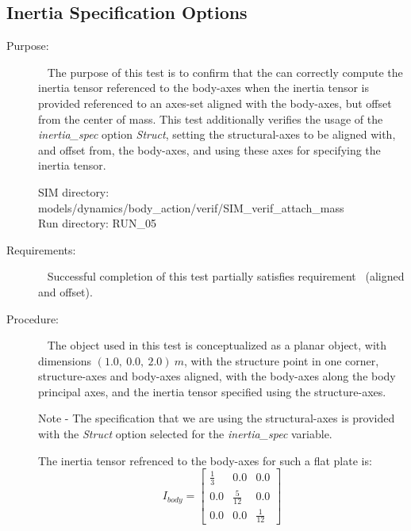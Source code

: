 \subsection{Inertia Specification Options}
\label{test:mass_05}
\begin{description}
\item[Purpose:] \ \newline
The purpose of this test is to confirm that the \ModelDesc
can correctly compute the inertia tensor referenced to the body-axes when the 
inertia tensor is provided referenced to an axes-set aligned with the 
body-axes, but offset from the center of mass.  This test additionally 
verifies the usage of the \textit{inertia\_spec} option \textit{Struct}, 
setting the structural-axes to be aligned with, and offset from, the 
body-axes, and using these axes for specifying the inertia tensor.

SIM directory: models/dynamics/body\_action/verif/SIM\_verif\_attach\_mass\\
Run directory: RUN\_05

\item[Requirements:] \ \newline
Successful completion of this test partially satisfies
requirement~ (aligned and offset).

\item[Procedure:]\ \newline
The object used in this test is conceptualized as a planar object, with 
dimensions $(1.0, ~0.0, ~2.0) ~m$, with the structure point in one corner, 
structure-axes and body-axes aligned, with the body-axes along the body 
principal axes, and the inertia tensor specified using the structure-axes.

Note - The specification that we are using the structural-axes is provided 
with the \textit{Struct} option selected for the \textit{inertia\_spec} 
variable.


The inertia tensor refrenced to the body-axes for such a flat plate is:
\begin{equation*}
I_{body} = 
   \begin{bmatrix} \frac{1}{3} & 0.0   & 0.0  \\
                   0.0   & \frac{5}{12} & 0.0   \\
                    0.0  & 0.0   & \frac{1}{12} 
   \end{bmatrix}
\end{equation*} 


\end{description}
